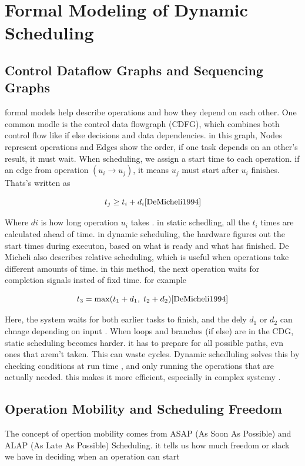 \documentclass[conference]{IEEEtran}
\begin{document}
\section{Formal Modeling of Dynamic Scheduling}

\subsection{Control Dataflow Graphs and Sequencing Graphs}

formal models help describe operations and how they depend on each other. One common modle is the control data flowgraph (CDFG), which combines both control flow like if else decisions and data dependencies. in this graph, Nodes represent operations and Edges show the order, if one task depends on an other's result, it must wait. When scheduling, we assign a start time to each operation. if an edge from operation  $(u_i \to u_j)$, it means $u_j$ must start after $u_i$ finishes. Thats's written as 

\[
t_j \geq t_i + d_i  \cite{DeMicheli1994}
\]

Where $di$ is how long operation $u_i$ takes \cite{DeMicheli1994}. in static schedling, all the $t_i$ times are calculated ahead of time. in dynamic scheduling, the hardware figures out the start times during executon, based on what is ready and what has finished. De Micheli also describes relative scheduling, which is useful when operations take different amounts of time. in this method, the next operation waits for completion signals insted of fixd time. for example 

\[
t_3 = \max(t_1 + d_1,\; t_2 + d_2) \cite{DeMicheli1994} 
\]

Here, the system waits for both earlier tasks to finish, and the dely $d_1$ or $d_2$ can chnage depending on input \cite{DeMicheli1994}. When loops and branches (if else) are in the CDG, static scheduling becomes harder. it has to prepare for all possible paths, evn ones that arem't taken. This can waste cycles. Dynamic schedluling solves this by checking conditions at run time , and only running the operations that are actually needed. this makes it more efficient, especially in complex systemy \cite{Rettberg2006, Ha2017}. 

\subsection{Operation Mobility and Scheduling Freedom}

The concept of opertion mobility comes from ASAP (As Soon As Possible) and ALAP (As Late As Possible) Scheduling. it tells us how much freedom or slack we have in deciding when an operation can start
\end{document}
